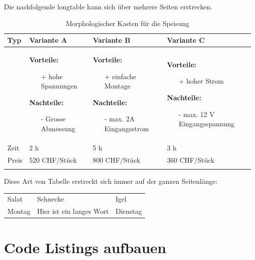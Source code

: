 Die nachfolgende longtable kann sich über mehrere Seiten erstrecken.

\begin{longtable}{|p{1.1cm}|p{4cm}|p{4cm}|p{4cm}|} 
					\hline
					\rowcolor{gray} Typ & Variante A & Variante B & Variante C
					\\ \hline
					& \textbf{Vorteile:} 
							\begin{itemize}
								\item[+] hohe Spannungen
							\end{itemize}							
							\textbf{Nachteile:}
							\begin{itemize}
								\item[-] Grosse Abmessung
							\end{itemize}
					& 	\textbf{Vorteile:} 
							\begin{itemize}
								\item[+] einfache Montage
							\end{itemize}							
							\textbf{Nachteile:}
							\begin{itemize}
								\item[-] max. 2A Eingangsstrom
							\end{itemize}
					&	\textbf{Vorteile:} 
							\begin{itemize}
								\item[+] hoher Strom
							\end{itemize}							
							\textbf{Nachteile:}
							\begin{itemize}
								\item[-] max. 12 V Eingangsspannung
							\end{itemize}\\ \hline
						Zeit & 2 h & 5 h & 3 h \\ \hline
						Preis	& 520 CHF/Stück & 800 CHF/Stück &	360 CHF/Stück\\ \hline
				\caption{Morphologischer Kasten für die Speisung}
				\label{tab:morphkasten}
			\end{longtable}	

Diese Art von Tabelle erstreckt sich immer auf der ganzen Seitenlänge:

\begin{tabularx}{\textwidth}{XXl}
  Salat & Schnecke & Igel\\
  Montag & Hier ist ein langes Wort & Dienstag
\end{tabularx}



\section{Code Listings aufbauen}\label{listing}

